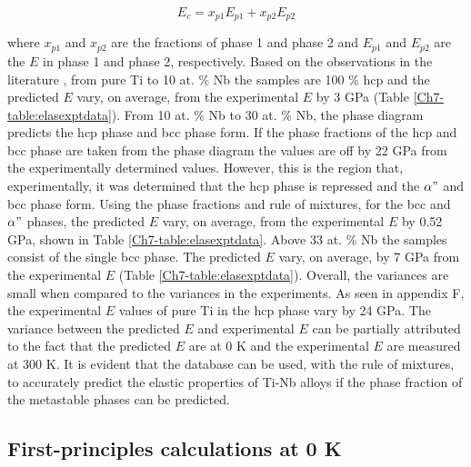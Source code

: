 \begin{equation}
\label{eq:ruleofmix}
E_{c}=x_{p1}E_{p1}+x_{p2}E_{p2}
\end{equation}

\noindent where $x_{p1}$ and $x_{p2}$ are the fractions of phase 1 and phase 2 and $E_{p1}$ and $E_{p2}$ are the $E$ in phase 1 and phase 2, respectively. Based on the observations in the literature \cite{Friak2012,Timoshevskii2011,Friak2012,Karre2015}, from pure Ti to 10 at. \% Nb the samples are 100 \% hcp and the predicted $E$ vary, on average, from the experimental $E$ by 3 GPa (Table \ref{Ch7-table:elasexptdata}). From 10 at. \% Nb to 30 at. \% Nb, the phase diagram predicts the hcp phase and bcc phase form. If the phase fractions of the hcp and bcc phase are taken from the phase diagram the values are off by 22 GPa from the experimentally determined values. However, this is the region that, experimentally, it was determined that the hcp phase is repressed and the $\alpha"$ and bcc phase form. Using the phase fractions and rule of mixtures, for the bcc and $\alpha"$ phases, the predicted $E$ vary, on average, from the experimental $E$ by 0.52 GPa, shown in Table \ref{Ch7-table:elasexptdata}. Above 33 at. \% Nb the samples consist of the single bcc phase. The predicted $E$ vary, on average, by 7 GPa from the experimental $E$ (Table \ref{Ch7-table:elasexptdata}). Overall, the variances are small when compared to the variances in the experiments. As seen in appendix F, the experimental $E$ values of pure Ti in the hcp phase vary by 24 GPa. The variance between the predicted $E$ and experimental $E$ can be partially attributed to the fact that the predicted $E$ are at 0 K and the experimental $E$ are measured at 300 K. It is evident that the database can be used, with the rule of mixtures, to accurately predict the elastic properties of Ti-Nb alloys if the phase fraction of the metastable phases can be predicted.

\subsection{First-principles calculations at 0 K}

